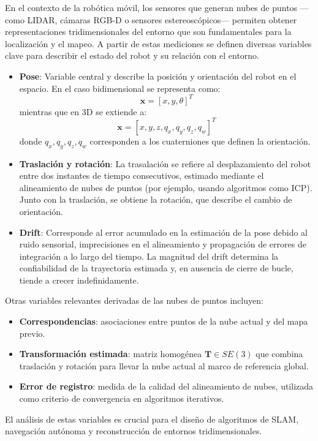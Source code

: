 \documentclass[12pt, a4paper, twoside]{article}
\begin{document}
En el contexto de la robótica móvil, los sensores que generan nubes de puntos ---como LIDAR, cámaras RGB-D o sensores 
estereoscópicos--- permiten obtener representaciones tridimensionales del entorno que son fundamentales para la localización 
y el mapeo. A partir de estas mediciones se definen diversas variables clave para describir el estado del robot y su relación con 
el entorno.

\begin{itemize}
  \item \textbf{Pose}: Variable central y describe la posición y orientación del robot en el espacio. En el caso bidimensional 
  se representa como:
  \[
  \mathbf{x} = [x, y, \theta]^{T}
  \]
  mientras que en 3D se extiende a:
  \[
  \mathbf{x} = [x, y, z, q_x, q_y, q_z, q_w]^{T}
  \]
  donde \( q_x, q_y, q_z, q_w \) corresponden a los cuaterniones que definen la orientación.
  \item \textbf{Traslación y rotación}: La trasalación se refiere al desplazamiento del robot entre dos instantes de tiempo 
  consecutivos, estimado mediante el alineamiento de nubes de puntos (por ejemplo, usando algoritmos como ICP). Junto con la 
  traslación, se obtiene la rotación, que describe el cambio de orientación.
  \item  \textbf{Drift}: Corresponde al error acumulado en la estimación de la pose debido al ruido sensorial, imprecisiones en 
  el alineamiento y propagación de errores de integración a lo largo del tiempo. La magnitud del drift determina la confiabilidad 
  de la trayectoria estimada y, en ausencia de cierre de bucle, tiende a crecer indefinidamente.
\end{itemize}
Otras variables relevantes derivadas de las nubes de puntos incluyen:
\begin{itemize}
    \item \textbf{Correspondencias}: asociaciones entre puntos de la nube actual y del mapa previo.
    \item \textbf{Transformación estimada}: matriz homogénea \( \mathbf{T} \in SE(3) \) que combina traslación y rotación para llevar la nube actual al marco de referencia global.
    \item \textbf{Error de registro}: medida de la calidad del alineamiento de nubes, utilizada como criterio de convergencia en algoritmos iterativos.
\end{itemize}
El análisis de estas variables es crucial para el diseño de algoritmos de SLAM\cite{smith1987slam}, navegación autónoma y reconstrucción de entornos 
tridimensionales.
\end{document}

